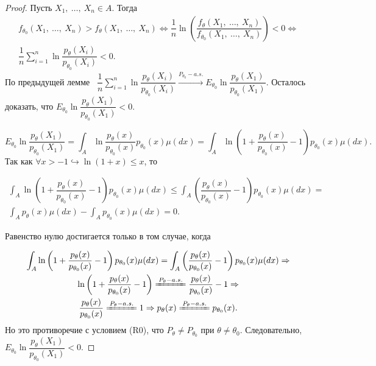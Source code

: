 \begin{proof}
    Пусть $\displaystyle X_{1} ,\ \dotsc ,\ X_{n} \in A$. Тогда
    \begin{gather*}
        f_{\theta _{0}}( X_{1} ,\ \dotsc ,\ X_{n})  >f_{\theta }( X_{1} ,\ \dotsc ,\ X_{n}) \Leftrightarrow \dfrac{1}{n}\ln\left(\dfrac{f_{\theta }( X_{1} ,\ \dotsc ,\ X_{n})}{f_{\theta _{0}}( X_{1} ,\ \dotsc ,\ X_{n})}\right) < 0\Leftrightarrow \\
        \dfrac{1}{n}\sum _{i=1}^{n}\ln\dfrac{p_{\theta }( X_{i})}{p_{\theta _{0}}( X_{i})} < 0.
    \end{gather*}
    По предыдущей лемме \ $\displaystyle \dfrac{1}{n}\sum _{i=1}^{n}\ln\dfrac{p_{\theta }( X_{i})}{p_{\theta _{0}}( X_{i})}\xrightarrow{P_{\theta_0 } -a.s.} E_{\theta _{0}}\ln\dfrac{p_{\theta }( X_{1})}{p_{\theta _{0}}( X_{1})}$. Осталось доказать, что $\displaystyle E_{\theta _{0}}\ln\dfrac{p_{\theta }( X_{1})}{p_{\theta _{0}}( X_{1})} < 0$.
    
    
    \begin{equation*}
        E_{\theta _{0}}\ln\dfrac{p_{\theta }( X_{1})}{p_{\theta _{0}}( X_{1})} =\int _{A}\ln\dfrac{p_{\theta }( x)}{p_{\theta _{0}}( x)} p_{\theta _{0}}( x) \mu ( dx) =\int _{A}\ln\left( 1+\dfrac{p_{\theta }( x)}{p_{\theta _{0}}( x)} -1\right) p_{\theta _{0}}( x) \mu ( dx) .
    \end{equation*}
    Так как $\displaystyle \forall x >-1\hookrightarrow \ln( 1+x) \leqslant x$, то
    
    
    \begin{gather*}
        \int _{A}\ln\left( 1+\dfrac{p_{\theta }( x)}{p_{\theta _{0}}( x)} -1\right) p_{\theta _{0}}( x) \mu ( dx) \leqslant \int _{A}\left(\dfrac{p_{\theta }( x)}{p_{\theta _{0}}( x)} -1\right) p_{\theta _{0}}( x) \mu ( dx) =\\
        \int _{A} p_{\theta }( x) \mu ( dx) -\int _{A} p_{\theta _{0}}( x) \mu ( dx) =0.
    \end{gather*}
    
    
    Равенство нулю достигается только в том случае, когда 
    
    
    \begin{gather*}
        \int _{A}\ln\left( 1+\dfrac{p_{\theta }( x)}{p_{\theta _{0}}( x)} -1\right) p_{\theta _{0}}( x) \mu ( dx) =\int _{A}\left(\dfrac{p_{\theta }( x)}{p_{\theta _{0}}( x)} -1\right) p_{\theta _{0}}( x) \mu ( dx) \Rightarrow \\
        \ln\left( 1+\dfrac{p_{\theta }( x)}{p_{\theta _{0}}( x)} -1\right)\xlongequal{P_{\theta } -a.s.}\dfrac{p_{\theta }( x)}{p_{\theta _{0}}( x)} -1\Rightarrow \\
        \dfrac{p_{\theta }( x)}{p_{\theta _{0}}( x)}\xlongequal{P_{\theta } -a.s.} 1\Rightarrow p_{\theta }( x)\xlongequal{P_{\theta } -a.s.} p_{\theta _{0}}( x) .
    \end{gather*}
    Но это противоречие с условием (R0), что $\displaystyle P_{\theta } \neq P_{\theta _{0}}$ при $\displaystyle \theta \neq \theta _{0}$. 
    \newline Следовательно, $\displaystyle E_{\theta _{0}}\ln\dfrac{p_{\theta }( X_{1})}{p_{\theta _{0}}( X_{1})} < 0$.
\end{proof}
